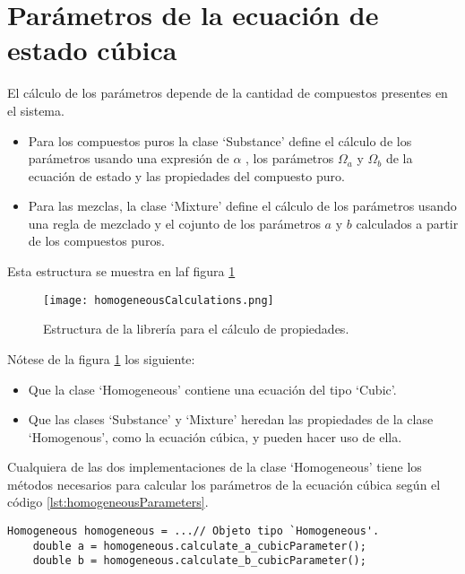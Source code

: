 \section{Parámetros de la ecuación de estado cúbica}\label{sec:parameters}

El cálculo de los parámetros depende de la cantidad de compuestos presentes en el sistema.

\begin{itemize}\itemsep0ex
 \item Para los compuestos puros la clase `Substance' define el cálculo de los parámetros usando una expresión de $\alpha$ , los parámetros $\Omega_a$ y $\Omega_b$ de la ecuación de estado y las propiedades del compuesto puro.
 \item Para las mezclas, la clase `Mixture' define el cálculo de los parámetros usando una regla de mezclado y el cojunto de los parámetros  $a$ y $b$ calculados a partir de los compuestos puros.
\end{itemize}


Esta estructura se muestra en laf figura \ref{fig:homogeneousCalculations}

\begin{figure}[!h]
  
  \centering
    \texttt{[image: homogeneousCalculations.png]}
    \caption{Estructura de la librería para el cálculo de propiedades.}
    \label{fig:homogeneousCalculations}
\end{figure}

Nótese de la figura \ref{fig:homogeneousCalculations} los siguiente:
\begin{itemize}\itemsep0ex
	\item Que la clase `Homogeneous' contiene una ecuación del tipo `Cubic'.
 	\item Que las clases `Substance' y `Mixture' heredan las propiedades de la clase `Homogenous', como la ecuación cúbica, y pueden hacer uso de ella.

\end{itemize}

	Cualquiera de las dos implementaciones de la clase `Homogeneous' tiene los métodos necesarios para calcular los parámetros de la ecuación cúbica según el código \ref{lst:homogeneousParameters}.

\begin{lstlisting}[caption=Cualquier objeto tipo `Homogeneous' puede calcular los parámetros de la ecuación de estado cúbica a y b, label={lst:homogeneousParameters}]
	Homogeneous homogeneous = ...// Objeto tipo `Homogeneous'.
	double a = homogeneous.calculate_a_cubicParameter();
	double b = homogeneous.calculate_b_cubicParameter();
\end{lstlisting}


